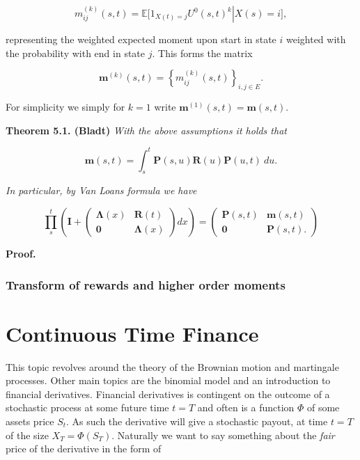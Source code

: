 \documentclass[
]{book}
\begin{document}
\[
m_{ij}^{(k)}(s,t)=\mathbb E\left.\Big[1_{X(t)=j}U^0(s,t)^k\right\vert X(s)=i\Big],
\]

representing the weighted expected moment upon start in state \(i\) weighted with the probability with end in state \(j\). This forms the matrix

\[
\mathbf m^{(k)}(s,t)=\left\{m_{ij}^{(k)}(s,t)\right\}_{i,j\in E}.
\]

For simplicity we simply for \(k=1\) write \(\mathbf m^{(1)}(s,t) = \mathbf m(s,t)\).

\textbf{Theorem 5.1. (Bladt)} \emph{With the above assumptions it holds that}

\[
\mathbf m(s,t)=\int_s^t\mathbf P(s,u)\mathbf R(u)\mathbf P(u,t)\ du.
\]

\emph{In particular, by Van Loans formula we have}

\[
\prod_s^t\left(\mathbf I + \begin{pmatrix}\mathbf \Lambda(x) & \mathbf R(t)\\ \mathbf 0 & \mathbf \Lambda(x)\end{pmatrix} dx\right)=
\begin{pmatrix}
\mathbf P(s,t) & \mathbf m(s,t)\\
\mathbf 0 & \mathbf P(s,t).
\end{pmatrix}
\]

\textbf{Proof.}

\hypertarget{transform-of-rewards-and-higher-order-moments}{%
\subsection{Transform of rewards and higher order moments}\label{transform-of-rewards-and-higher-order-moments}}

\hypertarget{continuous-time-finance}{%
\chapter{Continuous Time Finance}\label{continuous-time-finance}}

This topic revolves around the theory of the Brownian motion and martingale processes. Other main topics are the binomial model and an introduction to financial derivatives. Financial derivatives is contingent on the outcome of a stochastic process at some future time \(t=T\) and often is a function \(\Phi\) of some assets price \(S_t\). As such the derivative will give a stochastic payout, at time \(t=T\) of the size \(X_T=\Phi(S_T)\). Naturally we want to say something about the \emph{fair} price of the derivative in the form of
\end{document}
